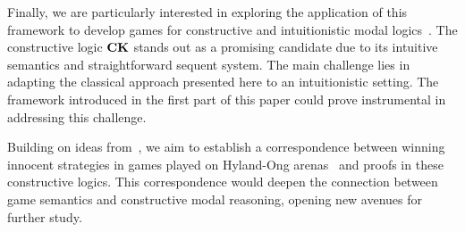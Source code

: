 Finally, we are particularly interested in exploring the application of this framework to develop games for constructive and intuitionistic modal logics~\cite{Fitch,plotkin:stirling:86,Sim94,DBLP:journals/sLogica/BiermanP00}. The constructive logic $\textbf{CK}$ stands out as a promising candidate due to its intuitive semantics and straightforward sequent system. The main challenge lies in adapting the classical approach presented here to an intuitionistic setting. The framework introduced in the first part of this paper could prove instrumental in addressing this challenge.

Building on ideas from~\cite{DBLP:conf/eumas/AcclavioC23}, we aim to establish a correspondence between winning innocent strategies in games played on Hyland-Ong arenas~\cite{DBLP:journals/iandc/HylandO00} and proofs in these constructive logics. This correspondence would deepen the connection between game semantics and constructive modal reasoning, opening new avenues for further study.

 